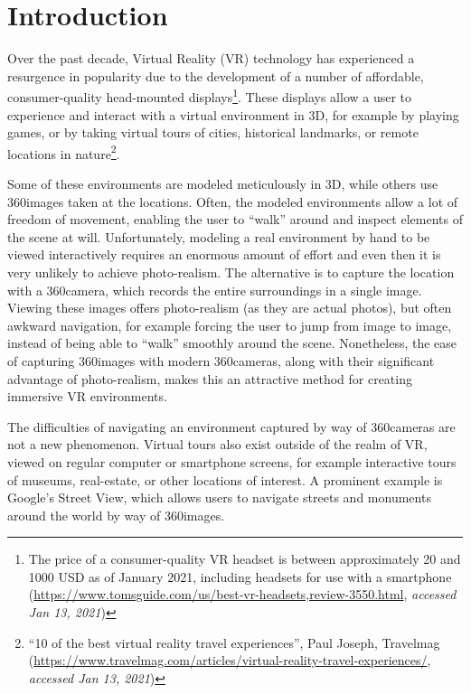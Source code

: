 \chapter{Introduction}

Over the past decade, Virtual Reality (VR) technology has experienced a resurgence in popularity due to the development of a number of affordable, consumer-quality head-mounted displays\footnote{The price of a consumer-quality VR headset is between approximately 20 and 1000 USD as of January 2021, including headsets for use with a smartphone (\url{https://www.tomsguide.com/us/best-vr-headsets,review-3550.html}, \emph{accessed Jan 13, 2021})}. These displays allow a user to experience and interact with a virtual environment in 3D, for example by playing games, or by taking virtual tours of cities, historical landmarks, or remote locations in nature\footnote{``10 of the best virtual reality travel experiences'', Paul Joseph, Travelmag (\url{https://www.travelmag.com/articles/virtual-reality-travel-experiences/}, \emph{accessed Jan 13, 2021})}.

Some of these environments are modeled meticulously in 3D, while others use 360\degree images taken at the locations. Often, the modeled environments allow a lot of freedom of movement, enabling the user to ``walk'' around and inspect elements of the scene at will. Unfortunately, modeling a real environment by hand to be viewed interactively requires an enormous amount of effort and even then it is very unlikely to achieve photo-realism. The alternative is to capture the location with a 360\degree camera, which records the entire surroundings in a single image. Viewing these images offers photo-realism (as they are actual photos), but often awkward navigation, for example forcing the user to jump from image to image, instead of being able to ``walk'' smoothly around the scene. Nonetheless, the ease of capturing 360\degree images with modern 360\degree cameras, along with their significant advantage of photo-realism, makes this an attractive method for creating immersive VR environments.

The difficulties of navigating an environment captured by way of 360\degree cameras are not a new phenomenon. Virtual tours also exist outside of the realm of VR, viewed on regular computer or smartphone screens, for example interactive tours of museums, real-estate, or other locations of interest. A prominent example is Google's Street View, which allows users to navigate streets and monuments around the world by way of 360\degree images.

